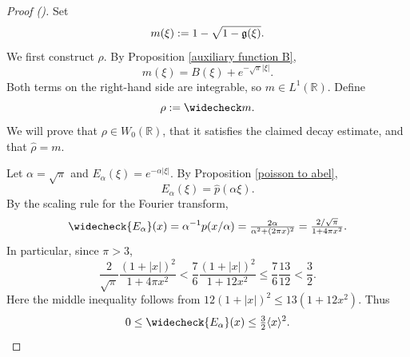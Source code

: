 \documentclass[12pt,reqno]{amsart}
\newcommand{\auto}{{({\tiny\faCar})}}
\theoremstyle{plain}
\numberwithin{equation}{section}
\theoremstyle{remark}
\newcommand{\R}{{\mathbb R}}
\begin{document}
\begin{proof}[Proof \auto]
Set
\[
    m(\xi):=1-\sqrt{1-\mathfrak{g}(\xi)}.
\]
We first construct \(\rho\). By Proposition \ref{auxiliary function B},
\[
    m(\xi)=B(\xi)+e^{-\sqrt{\pi}|\xi|}.
\]
Both terms on the right-hand side are integrable, so \(m\in L^1(\R)\). Define
\[
    \rho:=\widecheck m.
\]
We will prove that \(\rho\in W_0(\R)\), that it satisfies the claimed decay estimate, and that
\(\widehat\rho=m\).

Let \(\alpha=\sqrt{\pi}\) and \(E_\alpha(\xi)=e^{-\alpha|\xi|}\). By Proposition
\ref{poisson to abel},
\[
    E_\alpha(\xi)=\widehat p(\alpha \xi).
\]
By the scaling rule for the Fourier transform,
\[
    \widecheck{E_\alpha}(x)
    =
    \alpha^{-1}p(x/\alpha)
    =
    \tfrac{2\alpha}{\alpha^2+(2\pi x)^2}
    =
    \tfrac{2/\sqrt{\pi}}{1+4\pi x^2}.
\]
In particular, since $\pi>3$,
\[
\frac{2}{\sqrt\pi}\frac{(1+|x|)^2}{1+4\pi x^2}
<\frac76\frac{(1+|x|)^2}{1+12x^2}
\le\frac76\frac{13}{12}<\frac32.
\]
Here the middle inequality follows from
$12(1+|x|)^2\le13(1+12x^2)$.
Thus
\begin{equation}\label{eq:abel-decay}
    0\le \widecheck{E_\alpha}(x)\le \tfrac32\langle x\rangle^{2}.
\end{equation}


\end{proof}
\end{document}
